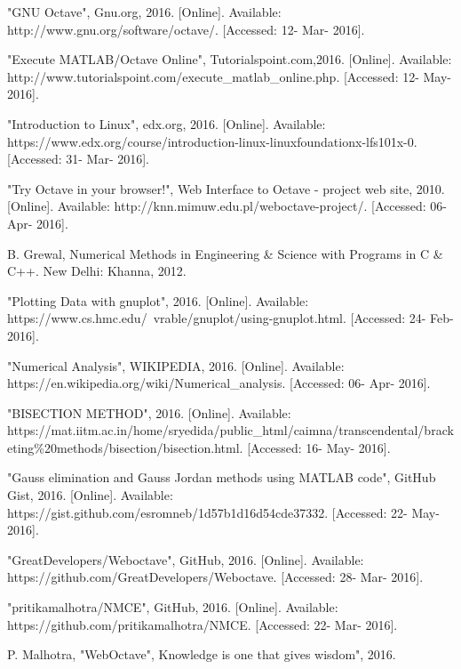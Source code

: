 \begin{thebibliography}{9}

\bibitem{} "GNU Octave", Gnu.org, 2016. [Online]. Available: http://www.gnu.org/software/octave/. [Accessed: 12- Mar- 2016].

\bibitem{} "Execute MATLAB/Octave Online", Tutorialspoint.com,2016. [Online]. Available: http://www.tutorialspoint.com/execute\_matlab\_online.php. [Accessed: 12- May- 2016].

\bibitem{} "Introduction to Linux", edx.org, 2016. [Online]. Available: https://www.edx.org/course/introduction-linux-linuxfoundationx-lfs101x-0. [Accessed: 31- Mar- 2016].

\bibitem{} "Try Octave in your browser!", Web Interface to Octave - project web site, 2010. [Online]. Available: http://knn.mimuw.edu.pl/weboctave-project/. [Accessed: 06- Apr- 2016].

\bibitem{} B.  Grewal, Numerical Methods in Engineering \& Science with Programs in C \& C++. New Delhi: Khanna, 2012.

\bibitem{} "Plotting Data with gnuplot", 2016. [Online]. Available: https://www.cs.hmc.edu/~vrable/gnuplot/using-gnuplot.html. [Accessed: 24- Feb- 2016].

\bibitem{} "Numerical Analysis", WIKIPEDIA, 2016. [Online]. Available: https://en.wikipedia.org/wiki/Numerical\_analysis. [Accessed: 06- Apr- 2016].

\bibitem{} "BISECTION METHOD", 2016. [Online]. Available: https://mat.iitm.ac.in/home/sryedida/public\_html/caimna/transcendental/bracketing\%20methods/bisection/bisection.html. [Accessed: 16- May- 2016].

\bibitem{} "Gauss elimination and Gauss Jordan methods using MATLAB code", GitHub Gist, 2016. [Online]. Available: https://gist.github.com/esromneb/1d57b1d16d54cde37332. [Accessed: 22- May- 2016].

\bibitem{} "GreatDevelopers/Weboctave", GitHub, 2016. [Online]. Available: https://github.com/GreatDevelopers/Weboctave. [Accessed: 28- Mar- 2016].

\bibitem{} "pritikamalhotra/NMCE", GitHub, 2016. [Online]. Available: https://github.com/pritikamalhotra/NMCE. [Accessed: 22- Mar- 2016].

\bibitem{} P.  Malhotra, "WebOctave", Knowledge is one that gives wisdom", 2016. 
\end{thebibliography}
